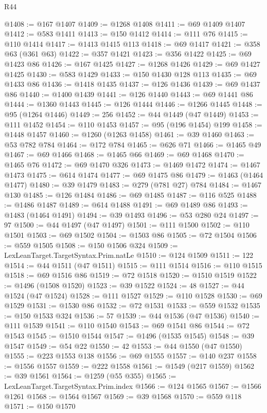 \begin{lexlean}{R44}
\begin{coremodule}
@1408 := @167 @1407
@1409 := @1268 @1408
@1411 := @69 @1409 @1407
@1412 := @583 @1411
@1413 := @150 @1412
@1414 := @111 @76
@1415 := @110 @1414
@1417 := @1413 @1415 @113
@1418 := @69 @1417
@1421 := @358 @63 (@361 @63)
@1422 := @357 @1421
@1423 := @356 @1422
@1425 := @69 @1423 @86
@1426 := @167 @1425
@1427 := @1268 @1426
@1429 := @69 @1427 @1425
@1430 := @583 @1429
@1433 := @150 @1430 @128 @113
@1435 := @69 @1433 @86
@1436 := @1418 @1435
@1437 := @126 @1436
@1439 := @69 @1437 @86
@1440 := @1400 @1439
@1441 := @126 @1440
@1443 := @69 @1441 @86
@1444 := @1360 @1443
@1445 := @126 @1444
@1446 := @1266 @1445
@1448 := @95 (@1264 @1446)
@1449 := 256
@1452 := @44 @1449 (@47 @1449)
@1453 := @111 @1452
@1454 := @110 @1453
@1457 := @95 (@196 @1454) @199
@1458 := @1448 @1457
@1460 := @1260 (@1263 @1458)
@1461 := @39 @1460
@1463 := @53 @782 @784
@1464 := @172 @784
@1465 := @626 @71
@1466 := @1465 @49
@1467 := @69 @1466
@1468 := @1465 @66
@1469 := @69 @1468
@1470 := @1465 @76
@1472 := @69 @1470 @326
@1473 := @1469 @1472
@1474 := @1467 @1473
@1475 := @614 @1474
@1477 := @69 @1475 @86
@1479 := @1463 (@1464 @1477)
@1480 := @39 @1479
@1483 := @279 (@781 @27) @784
@1484 := @1467 @130
@1485 := @126 @1484
@1486 := @69 @1485
@1487 := @116 @525
@1488 := @1486 @1487
@1489 := @614 @1488
@1491 := @69 @1489 @86
@1493 := @1483 (@1464 @1491)
@1494 := @39 @1493
@1496 := @53 @280 @24
@1497 := 97
@1500 := @44 @1497 (@47 @1497)
@1501 := @111 @1500
@1502 := @110 @1501
@1503 := @69 @1502
@1504 := @1503 @86
@1505 := @72 @1504
@1506 := @559 @1505
@1508 := @150 @1506 @324
@1509 := LexLeanTarget.TargetSyntax.Prim.natLe
@1510 := @124 @1509
@1511 := 122
@1514 := @44 @1511 (@47 @1511)
@1515 := @111 @1514
@1516 := @110 @1515
@1518 := @69 @1516 @86
@1519 := @72 @1518
@1520 := @1510 @1519
@1522 := @1496 (@1508 @1520)
@1523 := @39 @1522
@1524 := 48
@1527 := @44 @1524 (@47 @1524)
@1528 := @111 @1527
@1529 := @110 @1528
@1530 := @69 @1529
@1531 := @1530 @86
@1532 := @72 @1531
@1533 := @559 @1532
@1535 := @150 @1533 @324
@1536 := 57
@1539 := @44 @1536 (@47 @1536)
@1540 := @111 @1539
@1541 := @110 @1540
@1543 := @69 @1541 @86
@1544 := @72 @1543
@1545 := @1510 @1544
@1547 := @1496 (@1535 @1545)
@1548 := @39 @1547
@1549 := @54 @22
@1550 := 42
@1553 := @44 @1550 (@47 @1550)
@1555 := @223 @1553 @138
@1556 := @69 @1555
@1557 := @140 @237
@1558 := @1556 @1557
@1559 := @222 @1558
@1561 := @1549 (@217 @1559)
@1562 := @39 @1561
@1564 := @1259 (@55 @355)
@1565 := LexLeanTarget.TargetSyntax.Prim.index
@1566 := @124 @1565
@1567 := @1566 @1261
@1568 := @1564 @1567
@1569 := @39 @1568
@1570 := @559 @118
@1571 := @150 @1570

\end{coremodule}
\end{lexlean}
